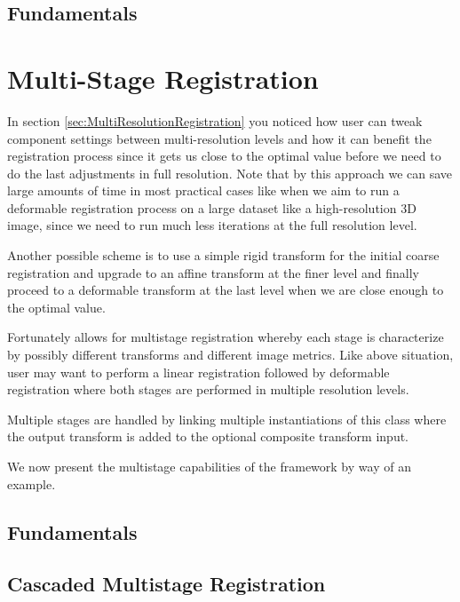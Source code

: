 \subsection{Fundamentals}
\ifitkFullVersion

\fi

\section{Multi-Stage Registration}
\label{sec:MultiStageRegistration}
In section \ref{sec:MultiResolutionRegistration} you noticed how user can tweak
component settings between multi-resolution levels and how it can benefit the
registration process since it gets us close to the optimal value before we need
to do the last adjustments in full resolution.
Note that by this approach we can save large amounts of time in most practical
cases like when we aim to run a deformable registration process on a large dataset
like a high-resolution 3D image, since we need to run much less iterations at the
full resolution level.

Another possible scheme is to use a simple rigid transform for the initial coarse
registration and upgrade to an affine transform at the finer level and finally
proceed to a deformable transform at the last level when we are close enough to
the optimal value.

Fortunately  allows for multistage registration
whereby each stage is characterize by possibly different transforms and different
image metrics. Like above situation, user may want to perform a linear registration
followed by deformable registration where both stages are performed in multiple
resolution levels.

Multiple stages are handled by linking multiple instantiations of this class where
the output transform is added to the optional composite transform input.

We now present the multistage capabilities of the framework by way of an example.

\subsection{Fundamentals}
\ifitkFullVersion

\fi

\subsection{Cascaded Multistage Registration}
\ifitkFullVersion

\fi

